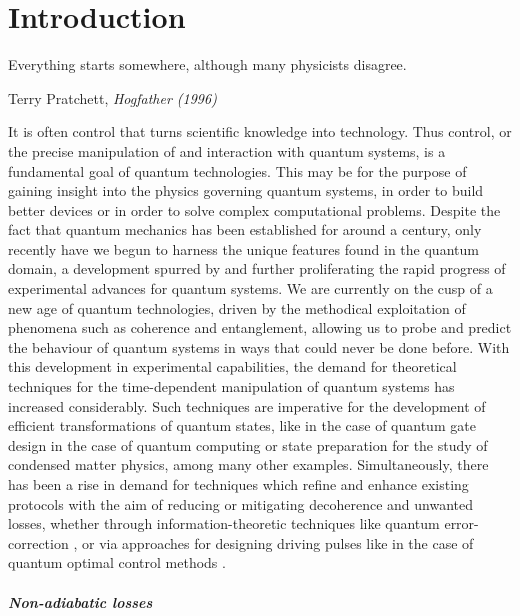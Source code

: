\chapter{Introduction}

\epigraph{Everything starts somewhere, although many physicists disagree.}{Terry Pratchett, \emph{Hogfather (1996)}}

It is often control that turns scientific knowledge into technology. Thus control, or the precise manipulation of and interaction with quantum systems, is a fundamental goal of quantum technologies. This may be for the purpose of gaining insight into the physics governing quantum systems, in order to build better devices or in order to solve complex computational problems. Despite the fact that quantum mechanics has been established for around a century, only recently have we begun to harness the unique features found in the quantum domain, a development spurred by and further proliferating the rapid progress of experimental advances for quantum systems. We are currently on the cusp of a new age of quantum technologies, driven by the methodical exploitation of phenomena such as coherence and entanglement, allowing us to probe and predict the behaviour of quantum systems in ways that could never be done before. With this development in experimental capabilities, the demand for theoretical techniques for the time-dependent manipulation of quantum systems has increased considerably. Such techniques are imperative for the development of efficient transformations of quantum states, like in the case of quantum gate design \cite{pelegri_high-fidelity_2022} in the case of quantum computing or state preparation \cite{dimitrova_many-body_2023} for the study of condensed matter physics, among many other examples. Simultaneously, there has been a rise in demand for techniques which refine and enhance existing protocols with the aim of reducing or mitigating decoherence and unwanted losses, whether through information-theoretic techniques like quantum error-correction \cite{roffe_quantum_2019}, or via approaches for designing driving pulses like in the case of quantum optimal control methods \cite{glaser_training_2015, koch_quantum_2022}. 

\paragraph*{Non-adiabatic losses}

